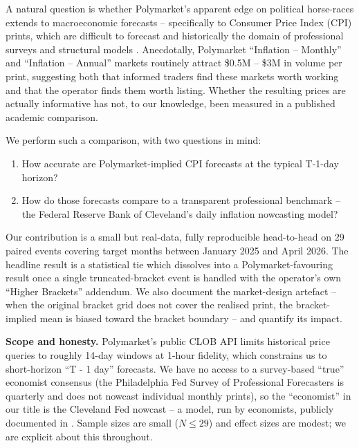 \documentclass{article}
\begin{document}
A natural question is whether Polymarket's apparent edge on political
horse-races extends to macroeconomic forecasts -- specifically to
Consumer Price Index (CPI) prints, which are difficult to forecast
\citep{stockwatson2007inflation,faust2013forecasting} and historically
the domain of professional surveys and structural models
\citep{ang2007macro,knotek2017nowcasting}.  Anecdotally, Polymarket
``Inflation -- Monthly'' and ``Inflation -- Annual'' markets routinely
attract \$0.5M -- \$3M in volume per print, suggesting both that
informed traders find these markets worth working and that the operator
finds them worth listing.  Whether the resulting prices are actually
informative has not, to our knowledge, been measured in a published
academic comparison.

We perform such a comparison, with two questions in mind:

\begin{enumerate}
\item How accurate are Polymarket-implied CPI forecasts at the
      typical T-1-day horizon?
\item How do those forecasts compare to a transparent professional
      benchmark -- the Federal Reserve Bank of Cleveland's daily
      inflation nowcasting model?
\end{enumerate}

Our contribution is a small but real-data, fully reproducible
head-to-head on 29 paired events covering target months between
January 2025 and April 2026.  The headline result is a statistical tie
which dissolves into a Polymarket-favouring result once a single
truncated-bracket event is handled with the operator's own
``Higher Brackets'' addendum.  We also document the market-design
artefact -- when the original bracket grid does not cover the realised
print, the bracket-implied mean is biased toward the bracket boundary
-- and quantify its impact.

\textbf{Scope and honesty.}  Polymarket's public CLOB API limits
historical price queries to roughly 14-day windows at 1-hour fidelity,
which constrains us to short-horizon ``T - 1 day'' forecasts.  We have
no access to a survey-based ``true'' economist consensus (the
Philadelphia Fed Survey of Professional Forecasters is quarterly and
does not nowcast individual monthly prints), so the ``economist'' in
our title is the Cleveland Fed nowcast -- a model, run by economists,
publicly documented in \citet{knotek2017nowcasting}.  Sample sizes are
small ($N \leq 29$) and effect sizes are modest; we are explicit about
this throughout.
\end{document}
